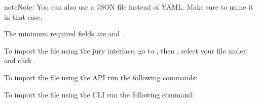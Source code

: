 \documentclass[a4paper,10pt,english,openany]{sphinxmanual}
\begin{document}
\begin{sphinxVerbatim}[commandchars=\\\{\}]
      
    
      
    
      

      
    
     
     
      
\end{sphinxVerbatim}

\begin{sphinxadmonition}{note}{Note:}
\sphinxAtStartPar
You can also use a JSON file instead of YAML. Make sure to name it
 in that case.

\sphinxAtStartPar
The minimum required fields are  and .
\end{sphinxadmonition}

\sphinxAtStartPar
To import the file using the jury interface, go to , then
, select your file under 
and click .

\sphinxAtStartPar
To import the file using the API run the following commands:

\begin{sphinxVerbatim}[commandchars=\\\{\}]
      
\end{sphinxVerbatim}

\sphinxAtStartPar
To import the file using the CLI run the following command:

\begin{sphinxVerbatim}[commandchars=\\\{\}]
      
\end{sphinxVerbatim}
\end{document}
